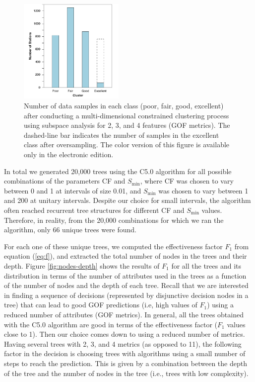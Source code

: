 \begin{figure}[t]
	\centering
	\includegraphics[width=0.45\textwidth]{figures/pdf/figure-07}
	\caption{Number of data samples in each class (poor, fair, good, excellent) after conducting a multi-dimensional constrained \kmeans{} clustering process using subspace analysis for 2, 3, and 4 features (GOF metrics). The dashed-line bar indicates the number of samples in the excellent class after oversampling. The color version of this figure is available only in the electronic edition.}
	\label{fig:count-classes}
\end{figure}

In total we generated 20,000 trees using the C5.0 algorithm for all possible combinations of the parameters CF and $S_{\min}$, where CF was chosen to vary between 0 and 1 at intervals of size 0.01, and $S_{\min}$ was chosen to vary between 1 and 200 at unitary intervals. Despite our choice for small intervals, the algorithm often reached recurrent tree structures for different CF and $S_{\min}$ values. Therefore, in reality, from the 20,000 combinations for which we ran the algorithm, only 66 unique trees were found.

For each one of these unique trees, we computed the effectiveness factor $F_1$ from equation (\ref{eq:f}), and extracted the total number of nodes in the trees and their depth. Figure \ref{fig:nodes-depth} shows the results of $F_1$ for all the trees and its distribution in terms of the number of  attributes  used in the trees as a function of the number of nodes and the depth of each tree. Recall that we are interested in finding a sequence of decisions (represented by disjunctive decision nodes in a tree) that can lead to good GOF predictions (i.e, high values of $F_1$) using a reduced number of attributes (GOF metrics). In general, all the trees obtained with the C5.0 algorithm are good in terms of the effectiveness factor ($F_1$ values close to 1). Then our choice comes down to using a reduced number of metrics. Having several trees with 2, 3, and 4 metrics (as opposed to 11), the following factor in the decision is choosing trees with algorithms using a small number of steps to reach the prediction. This is given by a combination between the depth of the tree and the number of nodes in the tree (i.e., trees with low complexity).

